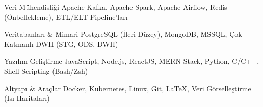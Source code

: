 
\begin{cvskills}

  \cvskill
    {Veri Mühendisliği}
    {Apache Kafka, Apache Spark, Apache Airflow, Redis (Önbellekleme), ETL/ELT Pipeline'ları}

  \cvskill
    {Veritabanları \& Mimari}
    {PostgreSQL (İleri Düzey), MongoDB, MSSQL, Çok Katmanlı DWH (STG, ODS, DWH)}

  \cvskill
    {Yazılım Geliştirme}
    {JavaScript, Node.js, ReactJS, MERN Stack, Python, C/C++, Shell Scripting (Bash/Zsh)}

  \cvskill
    {Altyapı \& Araçlar}
    {Docker, Kubernetes, Linux, Git, LaTeX, Veri Görselleştirme (Isı Haritaları)}

\end{cvskills}
